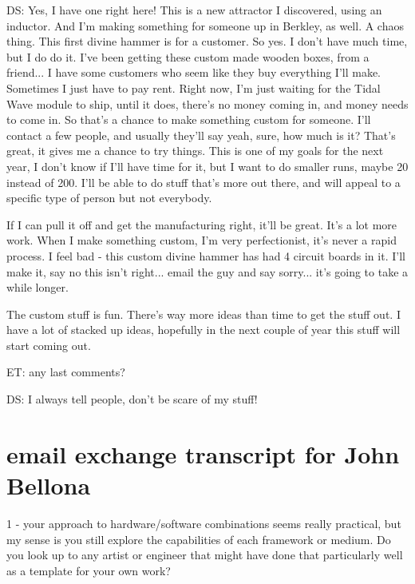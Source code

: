 DS: Yes, I have one right here! This is a new attractor I discovered, using an inductor. And I'm making something for someone up in Berkley, as well. A chaos thing. This first divine hammer is for a customer. So yes. I don't have much time, but I do do it. I've been getting these custom made wooden boxes, from a friend... I have some customers who seem like they buy everything I'll make. Sometimes I just have to pay rent. Right now, I'm just waiting for the Tidal Wave module to ship, until it does, there's no money coming in, and money needs to come in. So that's a chance to make something custom for someone. I'll contact a few people, and usually they'll say yeah, sure, how much is it? That's great, it gives me a chance to try things. This is one of my goals for the next year, I don't know if I'll have time for it, but I want to do smaller runs, maybe 20 instead of 200. I'll be able to do stuff that's more out there, and will appeal to a specific type of person but not everybody. 

If I can pull it off and get the manufacturing right, it'll be great. It's a lot more work. When I make something custom, I'm very perfectionist, it's never a rapid process. I feel bad - this custom divine hammer has had 4 circuit boards in it. I'll make it, say no this isn't right... email the guy and say sorry... it's going to take a while longer. 

The custom stuff is fun. There's way more ideas than time to get the stuff out. I have a lot of stacked up ideas, hopefully in the next couple of year this stuff will start coming out. 

ET: any last comments?

DS: I always tell people, don't be scare of my stuff! 

\section{email exchange transcript for John Bellona}

1 - your approach to hardware/software combinations seems really practical, but my sense is you still explore the capabilities of each framework or medium. Do you look up to any artist or engineer that might have done that particularly well as a template for your own work? 

